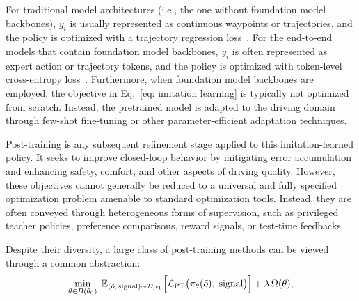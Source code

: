 \documentclass[runningheads]{llncs}
\begin{document}
For traditional model architectures (i.e., the one without foundation model backbones), \(y_i\) is usually represented as continuous waypoints or trajectories, and the policy is optimized with a trajectory regression loss~\cite{zheng2025diffusion,liao2025diffusiondrive}. 
For the end-to-end models that contain foundation model backbones, 
\(y_i\) is often represented as expert action or trajectory tokens, and the policy is optimized with token-level cross-entropy loss~\cite{mao2023gpt,hwang2024emma,autovla2025}. Furthermore, when foundation model backbones are employed, the objective in Eq.~\eqref{eq: imitation learning} is typically not optimized from scratch. Instead, the pretrained model is adapted to the driving domain through few-shot fine-tuning or other parameter-efficient adaptation techniques. 


\vspace{0.5em}
Post-training is any subsequent refinement stage applied to this imitation-learned policy. 
It seeks to improve closed-loop behavior by mitigating error accumulation and enhancing safety, comfort, and other aspects of driving quality.  
However, these objectives cannot generally be reduced to a universal and fully specified optimization problem amenable to standard optimization tools. 
Instead, they are often conveyed through heterogeneous forms of supervision, such as privileged teacher policies, preference comparisons, reward signals, or test-time feedbacks. 

Despite their diversity, a large class of post-training methods can be viewed through a common abstraction:  
\vspace{-0.2em}
\begin{align}
\label{eq: 1-3 post-training}
   \min_{\theta \in B(\theta_0)}\; \mathbb{E}_{(\tilde{o},\,\text{signal}) \sim \mathcal{D}_{\text{PT}}}\Bigl[ \mathcal{L}_{\text{PT}}\bigl(\pi_\theta(\tilde{o}),\; \text{signal}\bigr) \Bigr] + \lambda\,\Omega(\theta),
\end{align}
\baselineskip 
\end{document}

